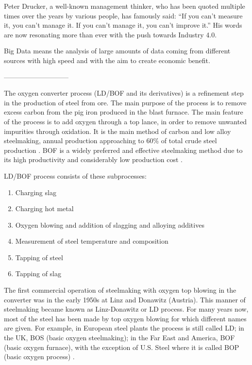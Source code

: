 Peter Drucker, a well-known management thinker, who has been quoted multiple times over the years by various people, has famously said: “If you can't measure it, you can't manage it. If you can't manage it, you can't improve it.” His words are now resonating more than ever with the push towards Industry 4.0.

Big Data means the analysis of large amounts of data coming from different sources with high speed and with the aim to create economic benefit.

-----------------------------


The oxygen converter process (LD/BOF and its derivatives) is a refinement step in the production of steel from ore. The main purpose of the process is to remove excess carbon from the pig iron produced in the blast furnace. The main feature of the process is to add oxygen through a top lance, in order to remove unwanted impurities through oxidation. It is the main method of carbon and low alloy steelmaking, annual production approaching to 60\% of total crude steel production \citep{Jalkanen2006}. BOF is a widely preferred and effective steelmaking method due to its high productivity and considerably low production cost \citep{Wang2010}.

 LD/BOF process consists of these subprocesses:

\begin{enumerate}
	\item Charging slag
	\item Charging hot metal 
	\item Oxygen blowing and addition of slagging and alloying additives
	\item Measurement of steel temperature and composition
	\item Tapping of steel
	\item Tapping of slag
\end{enumerate}

The first commercial operation of steelmaking with oxygen top blowing in the converter was in the early 1950s at Linz and Donawitz (Austria). This manner of steelmaking became known as Linz-Donawitz or LD process. For many years now, most of the steel has been made by top oxygen blowing for which different names are given. For example, in European steel plants the process is still called LD; in the UK, BOS (basic oxygen steelmaking); in the Far East and America, BOF (basic oxygen furnace), with the exception of U.S. Steel where it is called BOP (basic oxygen process) \citep{Turkdogan1996}.

